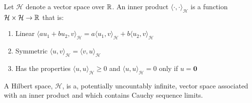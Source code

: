 \begin{definition}{}
	Let $\mathcal{H}$ denote a vector space over $\mathbb{R}$.  An inner product $\langle\cdot,\cdot\rangle_{\mathcal{H}}$ is a function $\mathcal{H} \times \mathcal{H} \rightarrow \mathbb{R}$ that is:
	\begin{enumerate}
		\item Linear $\langle a u_1 + b u_2,v\rangle_{\mathcal{H}} = a \langle u_1,v\rangle_{\mathcal{H}} +b\langle u_2,v\rangle_{\mathcal{H}} $
		\item Symmetric $\langle u,v\rangle_{\mathcal{H}}=\langle v,u\rangle_{\mathcal{H}}$
		\item Has the properties $\langle u,u\rangle_{\mathcal{H}} \ge 0$ and $\langle u,u\rangle_{\mathcal{H}} = 0$ only if $u=\mathbf{0}$
	\end{enumerate}
	\label{opt:def:InnerProduce}
\end{definition}
\begin{definition}{}
	A Hilbert space, $\mathcal{H}$, is a, potentially uncountably infinite, vector space associated with an inner product and which contains Cauchy sequence limits.
	\label{opt:def:HilbertSpace}
\end{definition}

